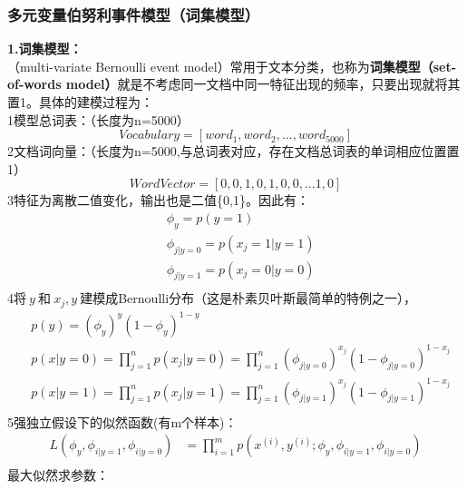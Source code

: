 \subsubsection{多元变量伯努利事件模型（词集模型）}%
\noindent\textbf{1.词集模型：}\\
（multi-variate Bernoulli event model）常用于文本分类，也称为\textbf{词集模型（set-of-words model）}就是不考虑同一文档中同一特征出现的频率，只要出现就将其置1。具体的建模过程为：\\
\textcircled{\footnotesize{1}}模型总词表：（长度为n=5000）
$$Vocabulary=[word_1,word_2,...,word_{5000}]$$
\textcircled{\footnotesize{2}}文档词向量：（长度为n=5000,与总词表对应，存在文档总词表的单词相应位置置1）
$$WordVector=[0,0,1,0,1,0,0,...1,0]$$
\textcircled{\footnotesize{3}}特征为离散二值变化，输出也是二值\{0,1\}。因此有：
\begin{equation}\nonumber
\begin{split}
  &\phi_y=p(y=1)\\
  &\phi_{j|y=0}=p(x_j=1|y=1)\\
  &\phi_{j|y=1}=p(x_j=0|y=0)\\
\end{split}
\end{equation}
\textcircled{\footnotesize{4}}将$~y~$和$~x_j,y~$建模成Bernoulli分布（这是朴素贝叶斯最简单的特例之一），
\begin{equation}\nonumber
\begin{split}
  &p(y)=(\phi_y)^y(1-\phi_y)^{1-y}\\
  &p(x|y=0)=\prod_{j=1}^{n}p(x_j|y=0)=\prod_{j=1}^{n}(\phi_{j|y=0})^{x_j}(1-\phi_{j|y=0})^{1-x_j}\\
  &p(x|y=1)=\prod_{j=1}^{n}p(x_j|y=1)=\prod_{j=1}^{n}(\phi_{j|y=1})^{x_j}(1-\phi_{j|y=1})^{1-x_j}\\
\end{split}
\end{equation}
\textcircled{\footnotesize{5}}强独立假设下的似然函数(有m个样本)：
\begin{equation}\nonumber
\begin{split}
  L(\phi_y,\phi_{i|y=1},\phi_{i|y=0})&=\prod_{i=1}^{m}p(x^{(i)},y^{(i)};\phi_y,\phi_{i|y=1},\phi_{i|y=0})\\
\end{split}
\end{equation}
{最大似然求参数：}
